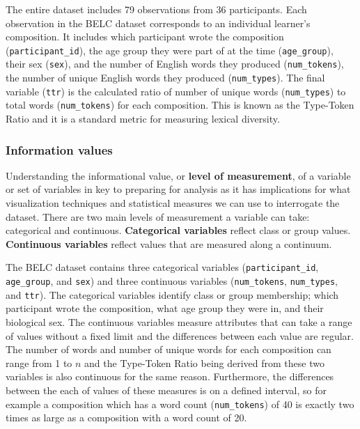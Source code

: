 \documentclass[
]{article}
\begin{document}
The entire dataset includes 79 observations from 36 participants. Each observation in the BELC dataset corresponds to an individual learner's composition. It includes which participant wrote the composition (\texttt{participant\_id}), the age group they were part of at the time (\texttt{age\_group}), their sex (\texttt{sex}), and the number of English words they produced (\texttt{num\_tokens}), the number of unique English words they produced (\texttt{num\_types}). The final variable (\texttt{ttr}) is the calculated ratio of number of unique words (\texttt{num\_types}) to total words (\texttt{num\_tokens}) for each composition. This is known as the Type-Token Ratio and it is a standard metric for measuring lexical diversity.

\hypertarget{information-values}{%
\subsubsection{Information values}\label{information-values}}

Understanding the informational value, or \textbf{level of measurement}, of a variable or set of variables in key to preparing for analysis as it has implications for what visualization techniques and statistical measures we can use to interrogate the dataset. There are two main levels of measurement a variable can take: categorical and continuous. \textbf{Categorical variables} reflect class or group values. \textbf{Continuous variables} reflect values that are measured along a continuum.

The BELC dataset contains three categorical variables (\texttt{participant\_id}, \texttt{age\_group}, and \texttt{sex}) and three continuous variables (\texttt{num\_tokens}, \texttt{num\_types}, and \texttt{ttr}). The categorical variables identify class or group membership; which participant wrote the composition, what age group they were in, and their biological sex. The continuous variables measure attributes that can take a range of values without a fixed limit and the differences between each value are regular. The number of words and number of unique words for each composition can range from 1 to \(n\) and the Type-Token Ratio being derived from these two variables is also continuous for the same reason. Furthermore, the differences between the each of values of these measures is on a defined interval, so for example a composition which has a word count (\texttt{num\_tokens}) of 40 is exactly two times as large as a composition with a word count of 20.
\end{document}

